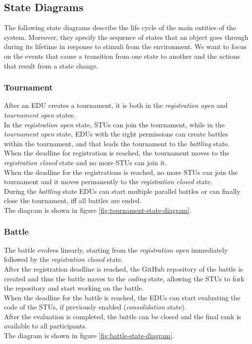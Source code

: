 \subsection{State Diagrams}
The following state diagrams describe the life cycle of the main entities of the system.
Moreover, they specify the sequence of states that an object goes through during its lifetime in response to stimuli from the environment.
We want to focus on the events that cause a transition from one state to another and the actions that result from a state change.

\subsubsection*{Tournament}
After an EDU creates a tournament, it is both in the \textit{registration open} and \textit{tournament open} states.\\
In the \textit{registration open} state, STUs can join the tournament, while in the \textit{tournament open} state, EDUs with the right permissions can create battles within the tournament, and that leads the tournament to the \textit{battling} state.\\
When the deadline for registration is reached, the tournament moves to the \textit{registration closed} state and no more STUs can join it.\\
When the deadline for the registrations is reached, no more STUs can join the tournament and it moves permanently to the \textit{registration closed} state.\\
During the \textit{battling} state EDUs can start multiple parallel battles or can finally close the tournament, iff all battles are ended.\\
The diagram is shown in figure \ref{fig:tournament-state-diagram}.

\subsubsection*{Battle}
The battle evolves linearly, starting from the \textit{registration open} immediately followed by the \textit{registration closed} state.\\
After the registration deadline is reached, the GitHub repository of the battle is created and thus the battle moves to the \textit{coding} state, allowing the STUs to fork the repository and start working on the battle.\\
When the deadline for the battle is reached, the EDUs can start evaluating the code of the STUs, if previously enabled (\textit{consolidation} state). \\
After the evaluation is completed, the battle can be closed and the final rank is available to all participants.\\
The diagram is shown in figure \ref{fig:battle-state-diagram}.

